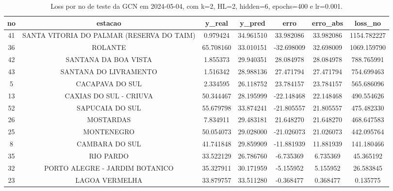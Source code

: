 \begin{table}[h]
\centering
\caption{Loss por no de teste da GCN em 2024-05-04, com k=2, HL=2, hidden=6, epochs=400 e lr=0.001.}
\label{tab:gcn_loss_k2_hl2_h6_e400_d20240504}
\begin{tabular}{ccccccc}
\toprule
no & estacao & y\_real & y\_pred & erro & erro\_abs & loss\_no \\
\midrule
41 & SANTA VITORIA DO PALMAR (RESERVA DO TAIM) & 0.979424 & 34.961510 & 33.982086 & 33.982086 & 1154.782227 \\
36 & ROLANTE & 65.708160 & 33.010151 & -32.698009 & 32.698009 & 1069.159790 \\
42 & SANTANA DA BOA VISTA & 1.855373 & 29.940351 & 28.084978 & 28.084978 & 788.765991 \\
43 & SANTANA DO LIVRAMENTO & 1.516342 & 28.988136 & 27.471794 & 27.471794 & 754.699463 \\
5 & CACAPAVA DO SUL & 2.334595 & 26.118752 & 23.784157 & 23.784157 & 565.686096 \\
13 & CAXIAS DO SUL - CRIUVA & 50.344467 & 28.195999 & -22.148468 & 22.148468 & 490.554626 \\
52 & SAPUCAIA DO SUL & 55.679798 & 33.874241 & -21.805557 & 21.805557 & 475.482330 \\
26 & MOSTARDAS & 7.834911 & 29.483181 & 21.648270 & 21.648270 & 468.647583 \\
25 & MONTENEGRO & 50.054073 & 29.028000 & -21.026073 & 21.026073 & 442.095764 \\
8 & CAMBARA DO SUL & 41.741848 & 29.859909 & -11.881939 & 11.881939 & 141.180466 \\
35 & RIO PARDO & 33.522129 & 26.786760 & -6.735369 & 6.735369 & 45.365192 \\
32 & PORTO ALEGRE - JARDIM BOTANICO & 35.327911 & 30.171959 & -5.155952 & 5.155952 & 26.583845 \\
23 & LAGOA VERMELHA & 33.879757 & 33.511280 & -0.368477 & 0.368477 & 0.135775 \\
\bottomrule
\end{tabular}
\end{table}
